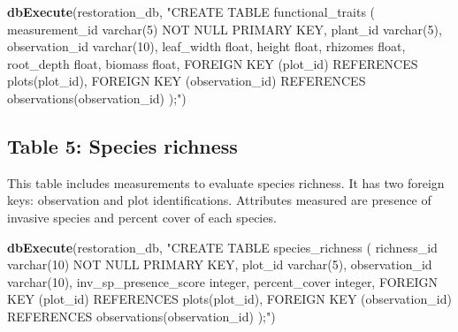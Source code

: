 \documentclass[
]{book}
\newenvironment{Shaded}{\begin{snugshade}}{\end{snugshade}}
\newcommand{\KeywordTok}[1]{\textcolor[rgb]{0.13,0.29,0.53}{\textbf{#1}}}
\newcommand{\NormalTok}[1]{#1}
\newcommand{\StringTok}[1]{\textcolor[rgb]{0.31,0.60,0.02}{#1}}
\begin{document}
\begin{Shaded}
\begin{Highlighting}[]
\KeywordTok{dbExecute}\NormalTok{(restoration_db, }\StringTok{"CREATE TABLE functional_traits (}
\StringTok{          measurement_id varchar(5) NOT NULL PRIMARY KEY,}
\StringTok{          plant_id varchar(5),}
\StringTok{          observation_id varchar(10), }
\StringTok{          leaf_width float, }
\StringTok{          height float, }
\StringTok{          rhizomes float, }
\StringTok{          root_depth float,}
\StringTok{          biomass float, }
\StringTok{          FOREIGN KEY (plot_id) REFERENCES plots(plot_id),}
\StringTok{          FOREIGN KEY (observation_id) REFERENCES observations(observation_id)}
\StringTok{          );"}\NormalTok{)}
\end{Highlighting}
\end{Shaded}

\hypertarget{table-5-species-richness}{%
\subsection{Table 5: Species richness}\label{table-5-species-richness}}

This table includes measurements to evaluate species richness. It has two foreign keys: observation and plot identifications. Attributes measured are presence of invasive species and percent cover of each species.

\begin{Shaded}
\begin{Highlighting}[]
\KeywordTok{dbExecute}\NormalTok{(restoration_db, }\StringTok{"CREATE TABLE species_richness (}
\StringTok{          richness_id varchar(10) NOT NULL PRIMARY KEY,}
\StringTok{          plot_id varchar(5),}
\StringTok{          observation_id varchar(10),}
\StringTok{          inv_sp_presence_score integer, }
\StringTok{          percent_cover integer,}
\StringTok{          FOREIGN KEY (plot_id) REFERENCES plots(plot_id),}
\StringTok{          FOREIGN KEY (observation_id) REFERENCES observations(observation_id)}
\StringTok{          );"}\NormalTok{)}
\end{Highlighting}
\end{Shaded}

  
\end{document}
